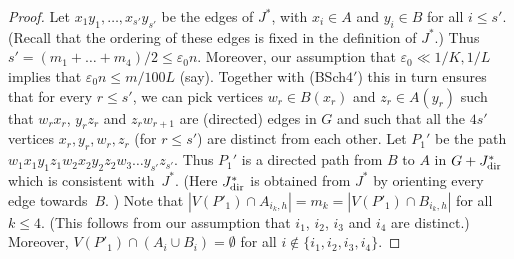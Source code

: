 \documentclass{memo-l}
\def\COMMENT#1{}
\def\eps{\varepsilon}
\def\epszero{\eps_0}
\numberwithin{section}{chapter}
\numberwithin{equation}{section}
\numberwithin{firstthm}{section}
\numberwithin{figure}{section}
\begin{document}
{\begin{proof}
Let $x_1y_1, \dots, x_{s'} y_{s'}$ be the edges of $J^*$, with $x_i \in A$ and $y_i \in B$ for all $i \le s'$.
(Recall that the ordering of these edges is fixed in the definition of $J^*$.)
Thus $s' = (m_1+\dots+m_4)/2 \le  \epszero n $. Moreover, our assumption that $\eps_0\ll 1/K,1/L$ implies that
$\eps_0 n\le m/100L$ (say). Together with (BSch$4'$) this in turn ensures that 
for every $r \le s'$, we can pick vertices $w_r \in B (x_r) $ and $z_r \in A(y_r)$ such that $w_rx_r$, $y_rz_r$ and $z_r w_{r+1}$ are
(directed) edges in $G$
and such that all the $4s'$ vertices $x_r,y_r,w_r,z_r$ (for $r\le s'$) are distinct from each other.
Let $P_1'$ be the path $w_1 x_1 y_1 z_1 w_2 x_2 y_2 z_2 w_3 \dots y_{s'} z_{s'}$.
Thus $P_1'$ is a directed path from $B$ to $A$ in $G + J^*_{\rm dir}$ which is consistent with~$J^*$. 
(Here $J^*_{\rm dir}$ is obtained from $J^*$ by orienting every edge towards~$B$.%
\COMMENT{Deryk})
Note that $|V(P'_1) \cap A_{i_k,h}| = m_k = |V(P'_1) \cap B_{i_k,h}|$ for all $k \le 4$.
(This follows from our assumption that $i_1$, $i_2$, $i_3$ and $i_4$ are distinct.) Moreover,
$V(P'_1) \cap ( A_i \cup B_i ) = \emptyset$ for all $i \notin \{i_1, i_2, i_3, i_4 \}$.


\end{proof}}
\end{document}

